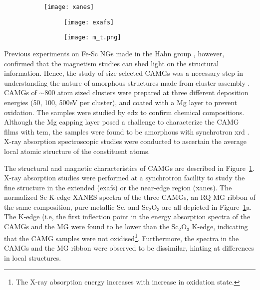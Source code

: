 \begin{figure}[!h] \centering
	\begin{subfigure}{0.5\linewidth} \centering %
		\texttt{[image: xanes]}
	\end{subfigure}%
	\hfill
	\begin{subfigure}{0.5\linewidth} \centering
		\begin{subfigure}{\linewidth} \centering
			\texttt{[image: exafs]}
		\end{subfigure}%
		\vfill
		\begin{subfigure}{\linewidth} \centering %
			\texttt{[image: m\_t.png]}
		\end{subfigure}%
	\end{subfigure}%
	
	\label{f:benel-camg}
\end{figure}

Previous experiments on Fe-Sc NGs made in the Hahn group \cite{Witte2013,Ghafari2012}, however, confirmed that the magnetism studies can shed light on the structural information. Hence, the study of size-selected \fs CAMGs was a necessary step in understanding the nature of amorphous structures made from cluster assembly \cite{Benel2019}. \fs CAMGs of $\sim$800 atom sized \fs clusters were prepared at three different deposition energies (50, 100, 500eV per cluster), and coated with a Mg layer to prevent oxidation. The samples were studied by \gls{edx} to confirm chemical compositions. Although the Mg capping layer posed a challenge to characterize the CAMG films with \gls{tem}, the samples were found to be amorphous with synchrotron \gls{xrd} \cite{Benel2019}. X-ray absorption spectroscopic studies were conducted to ascertain the average local atomic structure of the constituent atoms. \par

The structural and magnetic characteristics of \fs CAMGs are described in Figure~\ref{f:benel-camg}. X-ray absorption studies were performed at a synchrotron facility to study the fine structure in the extended (\gls{exafs}) or the near-edge region (\gls{xanes}). The normalized Sc K-edge XANES spectra of the three CAMGs, an RQ MG ribbon of the same composition, pure metallic Sc, and Sc$_{2}$O$_{3}$ are all depicted in Figure~\ref{f:benel-camg}a. The K-edge (i.e, the first inflection point in the energy absorption spectra of the CAMGs and the MG were found to be lower than the Sc$_{2}$O$_{3}$ K-edge, indicating that the CAMG samples were not oxidised\footnote{The X-ray absorption energy increases with increase in oxidation state.}. Furthermore, the spectra in the CAMGs and the MG ribbon were observed to be dissimilar, hinting at differences in local structures. \par

